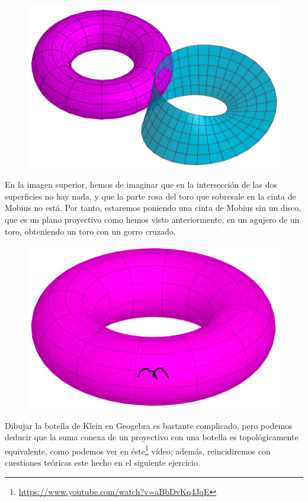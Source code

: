 \begin{enumerate}
\begin{figure}[H]
\centering
\includegraphics[scale=0.4]{images/universo/toro_mobius_1.png}
\end{figure}

En la imagen superior, hemos de imaginar que en la intersección de las dos superficies no hay nada, y que la parte rosa del toro que sobresale en la cinta de Mobius no está. Por tanto, estaremos poniendo una cinta de Mobius sin un disco, que es un plano proyectivo como hemos visto anteriormente, en un agujero de un toro, obteniendo un toro con un gorro cruzado.

\begin{figure}[H]
\centering
\includegraphics[scale=0.25]{images/universo/toro_mobius_2.png}
\end{figure}

Dibujar la botella de Klein en Geogebra es bastante complicado, pero podemos deducir que la suma conexa de un proyectivo con una botella es topológicamente equivalente, como podemos ver en éste\footnote{\url{https://www.youtube.com/watch?v=aBbDvKq4JqE}} vídeo; además, reincidiremos con cuestiones teóricas este hecho en el siguiente ejercicio.


\end{enumerate}
